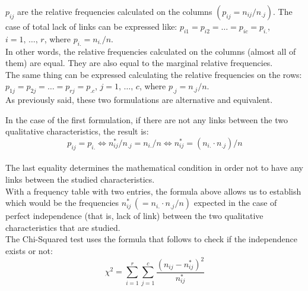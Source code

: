 \begin{frame}
  \vspace*{.25cm}
  $ p_{ij} $ are the relative frequencies calculated on the columns $ (p_{ij} = n_{ij}/n_{.j}) $. The case of total lack of links can be expressed like: $ p_{i1} = p_ {i2} = \dots = p_{ic} = p_{i.} $, $ i = 1, \, \dots, \, r $, where $ p_{i.} = n_{i.}/n $.\\
  In other words, the relative frequencies calculated on the columns (almost all of them) are equal. They are also equal to the marginal relative frequencies. \\
  \vspace*{.5cm}
  The same thing can be expressed calculating the relative frequencies on the rows: $ p_{1j} = p_{2j} = \dots = p_{rj} = p_{.c} $, $j = 1, \, \dots, \, c $, where $ p_{.j} = n_{.j}/n $.\\
  \vspace*{.5cm}
  As previously said, these two formulations are alternative and equivalent.
\end{frame}

\begin{frame}
  \vspace*{.25cm}
  In the case of the first formulation, if there are not any links between the two qualitative characteristics, the result is:\\
  \vspace*{-.3cm}
  $$ p_{ij}=p_{i.} \Longleftrightarrow n_{ij}^*/n_{.j} = n_{i.}/n  \Longleftrightarrow n_{ij}^* = (n_{i.} \cdot n_{.j})/n $$\\
  \vspace*{.1cm}
  The last equality determines the mathematical condition in order not to have any links between the studied characteristics.\\
  With a frequency table with two entries, the formula above allows us to establish which would be the frequencies $ n_{ij}^* \, ( = n_{i.} \cdot n_{.j}/n) $ expected in the case of perfect independence (that is, lack of link) between the two qualitative characteristics that are studied.\\
  The Chi-Squared test uses the formula that follows to check if the independence exists or not:
  $$ \chi^2 = \sum_{i=1}^r \sum_{j=1}^c{\frac{(n_{ij}-n_{ij}^*)^2}{n_{ij}^*}} $$
\end{frame}

